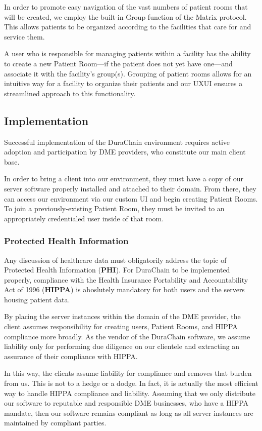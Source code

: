 \documentclass[letterpaper]{article}
\begin{document}
In order to promote easy navigation of the vast numbers of patient rooms that will be created, we employ the built-in Group function of the Matrix protocol. This allows patients to be organized according to the facilities that care for and service them.%

A user who is responsible for managing patients within a facility has the ability to create a new Patient Room---if the patient does not yet have one---and associate it with the facility's group(s). Grouping of patient rooms allows for an intuitive way for a facility to organize their patients and our UXUI ensures a streamlined approach to this functionality.%

 \subsection{Implementation}
 Successful implementation of the DuraChain environment requires active adoption and participation by DME providers, who constitute our main client base.%

 In order to bring a client into our environment, they must have a copy of our server software properly installed and attached to their domain. From there, they can access our environment via our custom UI and begin creating Patient Rooms. To join a previously-existing Patient Room, they must be invited to an appropriately credentialed user inside of that room.%

\subsubsection{Protected Health Information}
Any discussion of healthcare data must obligatorily address the topic of Protected Health Information (\textbf{PHI}). For DuraChain to be implemented properly, compliance with the Health Insurance Portability and Accountability Act of 1996 (\textbf{HIPPA}) is aboslutely mandatory for both users and the servers housing patient data.%

By placing the server instances within the domain of the DME provider, the client assumes responsibility for creating users, Patient Rooms, and HIPPA compliance more broadly. As the vendor of the DuraChain software, we assume liability only for performing due diligence on our clientele and extracting an assurance of their compliance with HIPPA.%

In this way, the clients assume liability for compliance and removes that burden from us. This is not to a hedge or a dodge. In fact, it is actually the most efficient way to handle HIPPA compliance and liability. Assuming that we only distribute our software to reputable and responsible DME businesses, who have a HIPPA mandate, then our software remains compliant as long as all server instances are maintained by compliant parties.%
\end{document}
